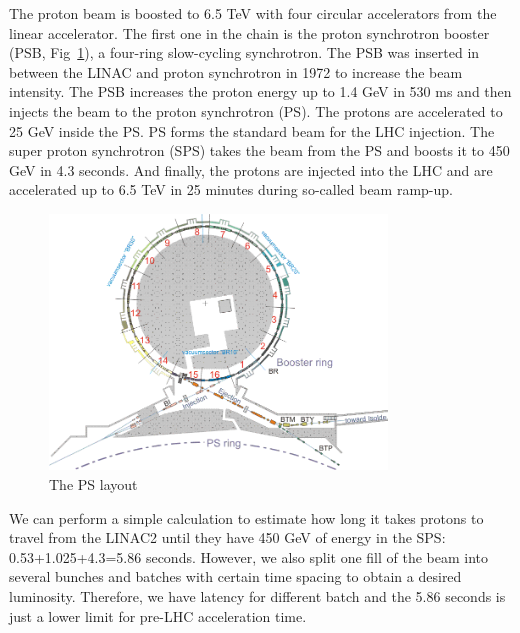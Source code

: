 The proton beam is boosted to 6.5 TeV with four circular accelerators from the linear accelerator. The first one in the chain is the proton synchrotron booster (PSB, Fig~\ref{fig:c3lhcpsb}), a four-ring slow-cycling synchrotron. The PSB was inserted in between the LINAC and proton synchrotron in 1972 to increase the beam intensity. The PSB increases the proton energy up to 1.4 GeV in 530 ms and then injects the beam to the proton synchrotron (PS). The protons are accelerated to 25 GeV inside the PS. PS forms the standard beam for the LHC injection. The super proton synchrotron (SPS) takes the beam from the PS and boosts it to 450 GeV in 4.3 seconds. And finally, the protons are injected into the LHC and are accelerated up to 6.5 TeV in 25 minutes during so-called beam ramp-up. 

\begin{figure}[htbp]
 \begin{center}
  \includegraphics[width=0.8\textwidth]{figures/c3/c3_lhc_psb.png}
 \end{center}
 \caption{The PS layout}
 \label{fig:c3lhcpsb}
\end{figure}

We can perform a simple calculation to estimate how long it takes protons to travel from the LINAC2 until they have 450 GeV of energy in the SPS: 0.53+1.025+4.3=5.86 seconds. However, we also split one fill of the beam into several bunches and batches with certain time spacing to obtain a desired luminosity. Therefore, we have latency for different batch and the 5.86 seconds is just a lower limit for pre-LHC acceleration time. 


